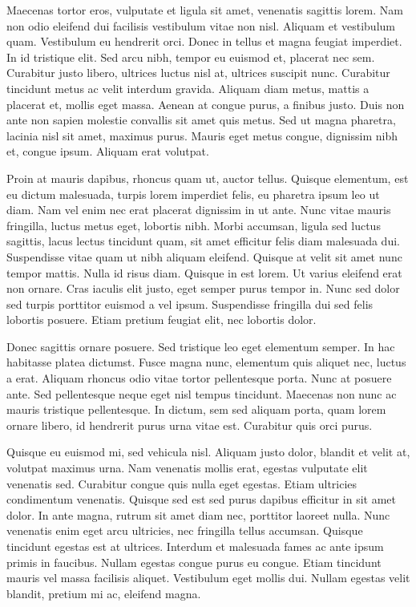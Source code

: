 Maecenas tortor eros, vulputate et ligula sit amet, venenatis sagittis lorem. Nam non odio eleifend dui facilisis vestibulum vitae non nisl. Aliquam et vestibulum quam. Vestibulum eu hendrerit orci. Donec in tellus et magna feugiat imperdiet. In id tristique elit. Sed arcu nibh, tempor eu euismod et, placerat nec sem. Curabitur justo libero, ultrices luctus nisl at, ultrices suscipit nunc. Curabitur tincidunt metus ac velit interdum gravida. Aliquam diam metus, mattis a placerat et, mollis eget massa. Aenean at congue purus, a finibus justo. Duis non ante non sapien molestie convallis sit amet quis metus. Sed ut magna pharetra, lacinia nisl sit amet, maximus purus. Mauris eget metus congue, dignissim nibh et, congue ipsum. Aliquam erat volutpat.

Proin at mauris dapibus, rhoncus quam ut, auctor tellus. Quisque elementum, est eu dictum malesuada, turpis lorem imperdiet felis, eu pharetra ipsum leo ut diam. Nam vel enim nec erat placerat dignissim in ut ante. Nunc vitae mauris fringilla, luctus metus eget, lobortis nibh. Morbi accumsan, ligula sed luctus sagittis, lacus lectus tincidunt quam, sit amet efficitur felis diam malesuada dui. Suspendisse vitae quam ut nibh aliquam eleifend. Quisque at velit sit amet nunc tempor mattis. Nulla id risus diam. Quisque in est lorem. Ut varius eleifend erat non ornare. Cras iaculis elit justo, eget semper purus tempor in. Nunc sed dolor sed turpis porttitor euismod a vel ipsum. Suspendisse fringilla dui sed felis lobortis posuere. Etiam pretium feugiat elit, nec lobortis dolor.

Donec sagittis ornare posuere. Sed tristique leo eget elementum semper. In hac habitasse platea dictumst. Fusce magna nunc, elementum quis aliquet nec, luctus a erat. Aliquam rhoncus odio vitae tortor pellentesque porta. Nunc at posuere ante. Sed pellentesque neque eget nisl tempus tincidunt. Maecenas non nunc ac mauris tristique pellentesque. In dictum, sem sed aliquam porta, quam lorem ornare libero, id hendrerit purus urna vitae est. Curabitur quis orci purus.

Quisque eu euismod mi, sed vehicula nisl. Aliquam justo dolor, blandit et velit at, volutpat maximus urna. Nam venenatis mollis erat, egestas vulputate elit venenatis sed. Curabitur congue quis nulla eget egestas. Etiam ultricies condimentum venenatis. Quisque sed est sed purus dapibus efficitur in sit amet dolor. In ante magna, rutrum sit amet diam nec, porttitor laoreet nulla. Nunc venenatis enim eget arcu ultricies, nec fringilla tellus accumsan. Quisque tincidunt egestas est at ultrices. Interdum et malesuada fames ac ante ipsum primis in faucibus. Nullam egestas congue purus eu congue. Etiam tincidunt mauris vel massa facilisis aliquet. Vestibulum eget mollis dui. Nullam egestas velit blandit, pretium mi ac, eleifend magna.

